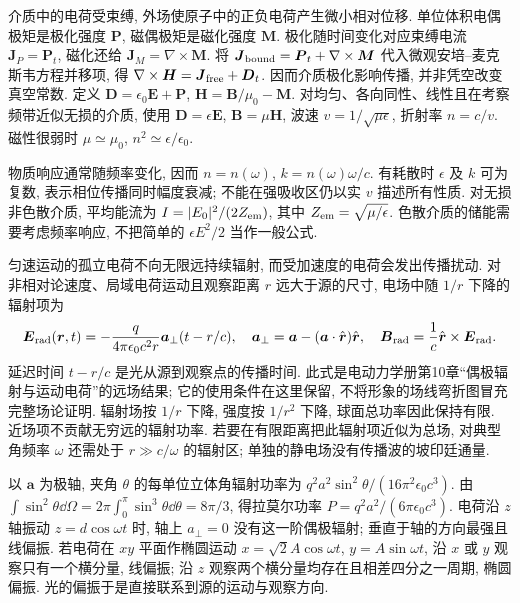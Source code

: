 介质中的电荷受束缚, 外场使原子中的正负电荷产生微小相对位移. 单位体积电偶极矩是极化强度 $\boldsymbol P$, 磁偶极矩是磁化强度 $\boldsymbol M$. 极化随时间变化对应束缚电流 $\boldsymbol J_P=\boldsymbol P_t$, 磁化还给 $\boldsymbol J_M=\nabla\times\boldsymbol M$. 将 $\boldsymbol J_{\rm bound}=\boldsymbol P_t+\nabla\times\boldsymbol M$ 代入微观安培--麦克斯韦方程并移项, 得 $\nabla\times\boldsymbol H=\boldsymbol J_{\rm free}+\boldsymbol D_t$. 因而介质极化影响传播, 并非凭空改变真空常数. 定义 $\boldsymbol D=\epsilon_0\boldsymbol E+\boldsymbol P$, $\boldsymbol H=\boldsymbol B/\mu_0-\boldsymbol M$. 对均匀、各向同性、线性且在考察频带近似无损的介质, 使用 $\boldsymbol D=\epsilon\boldsymbol E$, $\boldsymbol B=\mu\boldsymbol H$, 波速 $v=1/\sqrt{\mu\epsilon}$, 折射率 $n=c/v$. 磁性很弱时 $\mu\simeq\mu_0$, $n^2\simeq\epsilon/\epsilon_0$.

物质响应通常随频率变化, 因而 $n=n(\omega)$, $k=n(\omega)\omega/c$. 有耗散时 $\epsilon$ 及 $k$ 可为复数, 表示相位传播同时幅度衰减; 不能在强吸收区仍以实 $v$ 描述所有性质. 对无损非色散介质, 平均能流为 $I=|E_0|^2/(2Z_{\rm em})$, 其中 $Z_{\rm em}=\sqrt{\mu/\epsilon}$. 色散介质的储能需要考虑频率响应, 不把简单的 $\epsilon E^2/2$ 当作一般公式.

匀速运动的孤立电荷不向无限远持续辐射, 而受加速度的电荷会发出传播扰动. 对非相对论速度、局域电荷运动且观察距离 $r$ 远大于源的尺寸, 电场中随 $1/r$ 下降的辐射项为
\begin{equation}\label{eq:radiation}
\boldsymbol E_{\rm rad}(\boldsymbol r,t)
=-\frac{q}{4\pi\epsilon_0c^2r}\boldsymbol a_\perp(t-r/c),\quad
\boldsymbol a_\perp=\boldsymbol a-(\boldsymbol a\cdot\hat{\boldsymbol r})\hat{\boldsymbol r},\quad
\boldsymbol B_{\rm rad}=\frac1c\hat{\boldsymbol r}\times\boldsymbol E_{\rm rad}.
\end{equation}
延迟时间 $t-r/c$ 是光从源到观察点的传播时间. 此式是电动力学册第10章“偶极辐射与运动电荷”的远场结果; 它的使用条件在这里保留, 不将形象的场线弯折图冒充完整场论证明. 辐射场按 $1/r$ 下降, 强度按 $1/r^2$ 下降, 球面总功率因此保持有限. 近场项不贡献无穷远的辐射功率. 若要在有限距离把此辐射项近似为总场, 对典型角频率 $\omega$ 还需处于 $r\gg c/\omega$ 的辐射区; 单独的静电场没有传播波的坡印廷通量.

以 $\boldsymbol a$ 为极轴, 夹角 $\theta$ 的每单位立体角辐射功率为 $q^2a^2\sin^2\theta/(16\pi^2\epsilon_0c^3)$. 由 $\int\sin^2\theta\dd\Omega=2\pi\int_0^\pi\sin^3\theta\dd\theta=8\pi/3$, 得拉莫尔功率 $P=q^2a^2/(6\pi\epsilon_0c^3)$. 电荷沿 $z$ 轴振动 $z=d\cos\omega t$ 时, 轴上 $a_\perp=0$ 没有这一阶偶极辐射; 垂直于轴的方向最强且线偏振. 若电荷在 $xy$ 平面作椭圆运动 $x=\sqrt2A\cos\omega t$, $y=A\sin\omega t$, 沿 $x$ 或 $y$ 观察只有一个横分量, 线偏振; 沿 $z$ 观察两个横分量均存在且相差四分之一周期, 椭圆偏振. 光的偏振于是直接联系到源的运动与观察方向.
